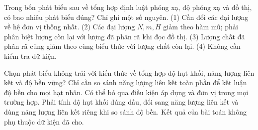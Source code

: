 \begin{ex}
Trong bốn phát biểu sau về tổng hợp định luật phóng xạ, độ phóng xạ và đồ thị, có bao nhiêu phát biểu đúng? Chỉ ghi một số nguyên. (1) Cần đổi các đại lượng về hệ đơn vị thống nhất. (2) Các đại lượng $N,m,H$ giảm theo hàm mũ; phải phân biệt lượng còn lại với lượng đã phân rã khi đọc đồ thị. (3) Lượng chất đã phân rã cũng giảm theo cùng biểu thức với lượng chất còn lại. (4) Không cần kiểm tra dữ kiện.
\end{ex}

\begin{ex}
Chọn phát biểu không trái với kiến thức về tổng hợp độ hụt khối, năng lượng liên kết và độ bền vững?
\choice
{Chỉ cần so sánh năng lượng liên kết toàn phần để kết luận độ bền cho mọi hạt nhân.}
{Có thể bỏ qua điều kiện áp dụng và đơn vị trong mọi trường hợp.}
{\True Phải tính độ hụt khối đúng dấu, đổi sang năng lượng liên kết và dùng năng lượng liên kết riêng khi so sánh độ bền.}
{Kết quả của bài toán không phụ thuộc dữ kiện đã cho.}
\end{ex}

